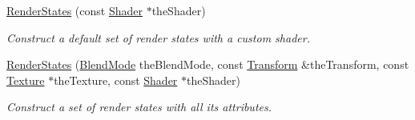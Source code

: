 \begin{DoxyCompactItemize}
\hyperlink{classsf_1_1RenderStates_a39f94233f464739d8d8522f3aefe97d0}{Render\-States} (const \hyperlink{classsf_1_1Shader}{Shader} $\ast$the\-Shader)
\begin{DoxyCompactList}\small\item\em Construct a default set of render states with a custom shader. \end{DoxyCompactList}\item 
\hyperlink{classsf_1_1RenderStates_ae508c91ac7b8992dc22b8d8a4027ad09}{Render\-States} (\hyperlink{group__graphics_ga80c52fe2f7050d7f7573b7ed3c995388}{Blend\-Mode} the\-Blend\-Mode, const \hyperlink{classsf_1_1Transform}{Transform} \&the\-Transform, const \hyperlink{classsf_1_1Texture}{Texture} $\ast$the\-Texture, const \hyperlink{classsf_1_1Shader}{Shader} $\ast$the\-Shader)
\begin{DoxyCompactList}\small\item\em Construct a set of render states with all its attributes. \end{DoxyCompactList}\end{DoxyCompactItemize}
